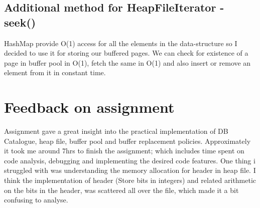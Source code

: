 \documentclass{article}
\begin{document}
\begin{titlepage}
\subsection{Additional method for HeapFileIterator - seek()}
HashMap provide O(1) access for all the elements in the data-structure so I decided to use it for storing our buffered pages. We can check for existence of a page in buffer pool in O(1), fetch the same in O(1) and also insert or remove an element from it in constant time.

\section{Feedback on assignment}
Assignment gave a great insight into the practical implementation of DB Catalogue, heap file, buffer pool and buffer replacement policies. Approximately it took me around 7hrs to finish the assignment; which includes time spent on code analysis, debugging and implementing the desired code features. One thing i struggled with was understanding the memory allocation for header in heap file. I think the implementation of header (Store bits in integers) and related arithmetic on the bits in the header, was scattered all over the file, which made it a bit confusing to analyse. 

\end{titlepage}
\end{document}

